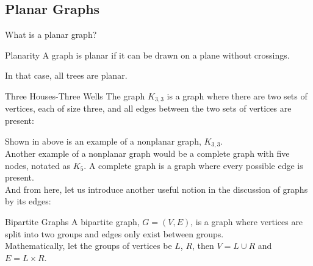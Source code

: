 \subsection{Planar Graphs}
What is a planar graph?
\begin{ln-define}{Planarity}{}
    A graph is planar if it can be drawn on a plane without crossings.
\end{ln-define}
In that case, all trees are planar. \\
\begin{ln-symbol}{Three Houses-Three Wells}{}
    The graph $K_{3,3}$ is a graph where there are two sets of vertices, each of size three, and all edges between the two sets of vertices are present:
    \begin{center}
    \end{center}
\end{ln-symbol}
Shown in above is an example of a nonplanar graph, $K_{3,3}$. \\
Another example of a nonplanar graph would be a complete graph with five nodes, notated as $K_5$. A complete graph is a graph where every possible edge is present. \\
And from here, let us introduce another useful notion in the discussion of graphs by its edges:
\begin{ln-define}{Bipartite Graphs}{}
    A bipartite graph, $G = (V, E)$, is a graph where vertices are split into two groups and edges only exist between groups. \\
    Mathematically, let the groups of vertices be $L$, $R$, then $V = L \cup R$ and $E = L \times R$.
\end{ln-define}

